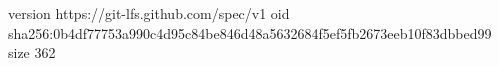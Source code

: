 version https://git-lfs.github.com/spec/v1
oid sha256:0b4df77753a990c4d95c84be846d48a5632684f5ef5fb2673eeb10f83dbbed99
size 362
